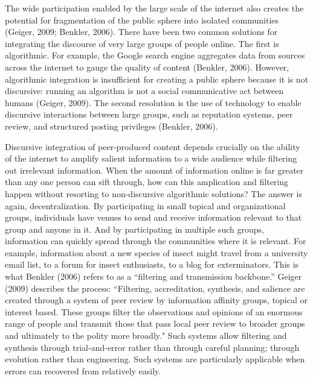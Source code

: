 The wide participation enabled by the large scale of the internet also creates the potential for fragmentation of the public sphere into isolated communities (Geiger, 2009; Benkler, 2006). There have been two common solutions for integrating the discourse of very large groups of people online. The first is algorithmic. For example, the Google search engine aggregates data from sources across the internet to gauge the quality of content (Benkler, 2006). However, algorithmic integration is insufficient for creating a public sphere because it is not discursive: running an algorithm is not a social communicative act between humans (Geiger, 2009). The second resolution is the use of technology to enable discursive interactions between large groups, such as reputation systems, peer review, and structured posting privileges (Benkler, 2006).

Discursive integration of peer-produced content depends crucially on the ability of the internet to amplify salient information to a wide audience while filtering out irrelevant information. When the amount of information online is far greater than any one person can sift through, how can this amplication and filtering happen without resorting to non-discursive algorithmic solutions? The answer is again, decentralization. By participating in small topical and organizational groups, individuals have venues to send and receive information relevant to that group and anyone in it. And by participating in multiple such groups, information can quickly spread through the communities where it is relevant. For example, information about a new species of insect might travel from a university email list, to a forum for insect enthusiasts, to a blog for exterminators. This is what Benkler (2006) refers to as a ``filtering and transmission backbone.'' Geiger (2009) describes the process:
``Filtering, accreditation, synthesis, and salience are created through a system of peer review by information affinity groups, topical or interest based. These groups filter the observations and opinions of an enormous range of people and transmit those that pass local peer review to broader groups and ultimately to the polity more broadly." Such systems allow filtering and synthesis through trial-and-error rather than through careful planning; through evolution rather than engineering. Such systems are particularly applicable when errors can recovered from relatively easily.


